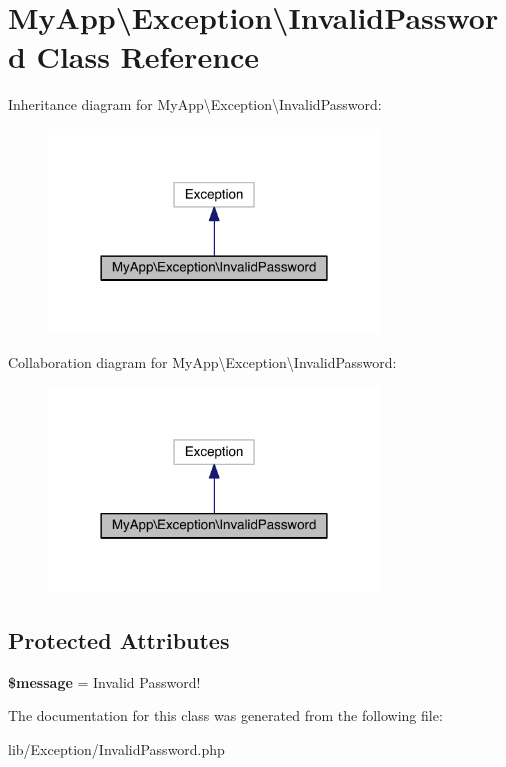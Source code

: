 \hypertarget{class_my_app_1_1_exception_1_1_invalid_password}{}\section{My\+App\textbackslash{}Exception\textbackslash{}Invalid\+Password Class Reference}
\label{class_my_app_1_1_exception_1_1_invalid_password}


Inheritance diagram for My\+App\textbackslash{}Exception\textbackslash{}Invalid\+Password\+:
\nopagebreak
\begin{figure}[H]
\begin{center}
\leavevmode
\includegraphics[width=249pt]{class_my_app_1_1_exception_1_1_invalid_password__inherit__graph}
\end{center}
\end{figure}


Collaboration diagram for My\+App\textbackslash{}Exception\textbackslash{}Invalid\+Password\+:
\nopagebreak
\begin{figure}[H]
\begin{center}
\leavevmode
\includegraphics[width=249pt]{class_my_app_1_1_exception_1_1_invalid_password__coll__graph}
\end{center}
\end{figure}
\subsection*{Protected Attributes}
\begin{DoxyCompactItemize}
\item 
{\bfseries \$message} = \textquotesingle{}Invalid Password!\textquotesingle{}\hypertarget{class_my_app_1_1_exception_1_1_invalid_password_a22827c681fe61dd1d527bba299dba443}{}\label{class_my_app_1_1_exception_1_1_invalid_password_a22827c681fe61dd1d527bba299dba443}

\end{DoxyCompactItemize}


The documentation for this class was generated from the following file\+:\begin{DoxyCompactItemize}
\item 
lib/\+Exception/Invalid\+Password.\+php\end{DoxyCompactItemize}
